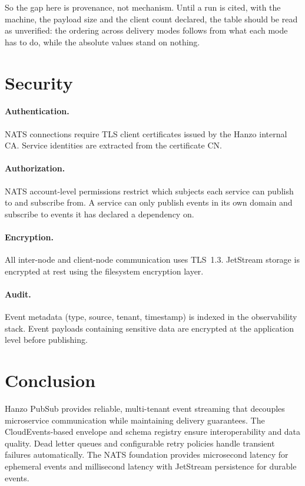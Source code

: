 \documentclass[11pt,twocolumn]{article}
\begin{document}
So the gap here is provenance, not mechanism. Until a run is cited, with the
machine, the payload size and the client count declared, the table should be
read as unverified: the ordering across delivery modes follows from what each
mode has to do, while the absolute values stand on nothing.

\section{Security}

\paragraph{Authentication.} NATS connections require TLS client certificates issued by the Hanzo internal CA. Service identities are extracted from the certificate CN.

\paragraph{Authorization.} NATS account-level permissions restrict which subjects each service can publish to and subscribe from. A service can only publish events in its own domain and subscribe to events it has declared a dependency on.

\paragraph{Encryption.} All inter-node and client-node communication uses TLS~1.3. JetStream storage is encrypted at rest using the filesystem encryption layer.

\paragraph{Audit.} Event metadata (type, source, tenant, timestamp) is indexed in the observability stack. Event payloads containing sensitive data are encrypted at the application level before publishing.

\section{Conclusion}

Hanzo PubSub provides reliable, multi-tenant event streaming that decouples microservice communication while maintaining delivery guarantees. The CloudEvents-based envelope and schema registry ensure interoperability and data quality. Dead letter queues and configurable retry policies handle transient failures automatically. The NATS foundation provides microsecond latency for ephemeral events and millisecond latency with JetStream persistence for durable events.
\end{document}

